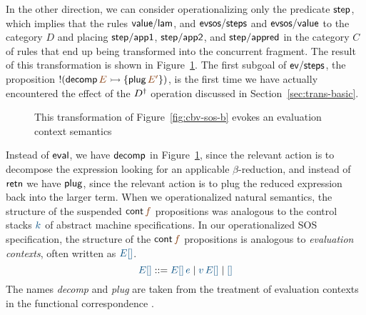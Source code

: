 In the other direction, we can consider operationalizing only the
predicate ${\sf step}$, which implies that the rules ${\sf
  value/lam}$, and ${\sf evsos/steps}$ and ${\sf evsos/value}$ to the
category $D$ and placing ${\sf step/app1}$, ${\sf step/app2}$, and
${\sf step/appred}$ in the category $C$ of rules that end up being
transformed into the concurrent fragment.  The result of this
transformation is shown in Figure~\ref{fig:cbv-sos}. The
first subgoal of ${\sf ev/steps}$, the proposition ${!}({\sf
  decomp}\,\lf{E} \lefti \{ {\sf plug}\,\lf{E'} \})$, is the first
time we have actually encountered the effect of the ${{D}^\dag}$
operation discussed in Section~\ref{sec:trans-basic}.

\begin{figure}[t]
\begin{minipage}[b]{0.9\linewidth}
\end{minipage}
\caption{This transformation of Figure~\ref{fig:cbv-sos-b} evokes an
  evaluation context semantics}
\label{fig:cbv-sos}
\end{figure}


Instead of ${\sf eval}$, we
have ${\sf decomp}$ in Figure~\ref{fig:cbv-sos}, since the relevant
action is to decompose the expression looking for an applicable
$\beta$-reduction, and instead of ${\sf retn}$ we have ${\sf plug}$,
since the relevant action is to plug the reduced expression back into
the larger term.  When we operationalized natural semantics, the
structure of the suspended ${\sf cont}\,\lf{f}$ propositions was
analogous to the control stacks $\obj{k}$ of abstract machine
specifications. In our operationalized SOS specification, the
structure of the ${\sf cont}\,\lf{f}$ propositions is analogous to
{\it evaluation contexts}, often written as $\obj{E[]}$.
\[
\obj{E[]} ::= \obj{E[]\,e} \mid \obj{v\,E[]} \mid \obj{[]}
\]
The names {\it decomp} and {\it plug} are taken from the treatment
of evaluation contexts in the functional correspondence
\cite{danvy08defunctionalized}.





